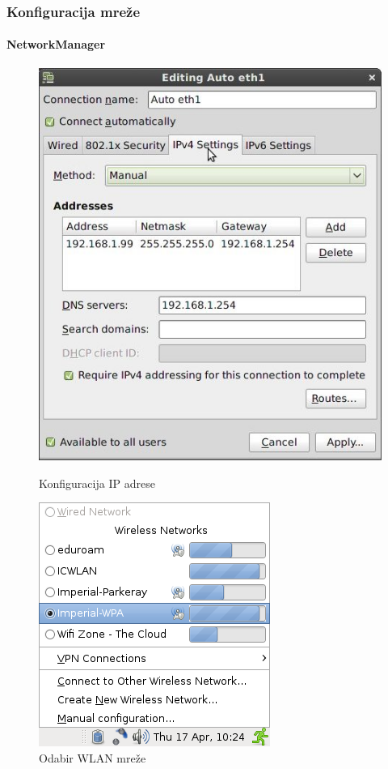 \documentclass[t,table,usenames,dvipsnames]{beamer}
\begin{document}
\begin{frame}
	\frametitle{Konfiguracija mreže}
	\framesubtitle{NetworkManager}
	
	\begin{figure}[h]
		\begin{minipage}{0.4\textwidth}
			\centering
			\includegraphics[width=\linewidth]{nm-ethernet.jpg}
			\caption*{Konfiguracija IP adrese}
		\end{minipage}
		\begin{minipage}{0.45\textwidth}
			\centering
			\includegraphics[width=0.8\linewidth]{nm-applet.png}
			\caption*{Odabir WLAN mreže}
		\end{minipage}
	\end{figure}
\end{frame}
\end{document}
